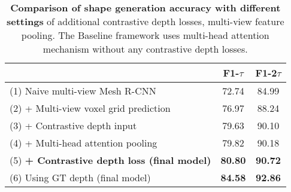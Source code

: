 
\begin{table}[ht]
\begin{center}
\footnotesize
\begin{tabular}{ l c c }
\toprule[1pt]
 &F1-$\tau$ &F1-2$\tau$   \\ \hline
(1) Naive multi-view Mesh R-CNN \qquad \qquad  \qquad  \qquad  \qquad & 72.74 & 84.99 \\
(2) + Multi-view voxel grid prediction & 76.97 & 88.24 \\
(3) + Contrastive depth input             & 79.63 & 90.10 \\
(4) + Multi-head attention pooling   & 79.82    & 90.18  \\
(5) \bf{+ Contrastive depth loss (final model)}  & \textbf{80.80} & \textbf{90.72}\\
(6) Using GT depth (final model)                 & \textbf{84.58} & \textbf{92.86} \\
\bottomrule[1pt]
\end{tabular}
\end{center}
\vspace{-4mm}
\caption{
    \textbf{Comparison of shape generation accuracy with different settings} of additional contrastive depth losses, multi-view feature pooling.
    The Baseline framework uses multi-head attention mechanism without any contrastive depth losses.
}
\label{table:ablation_study}
\end{table}


